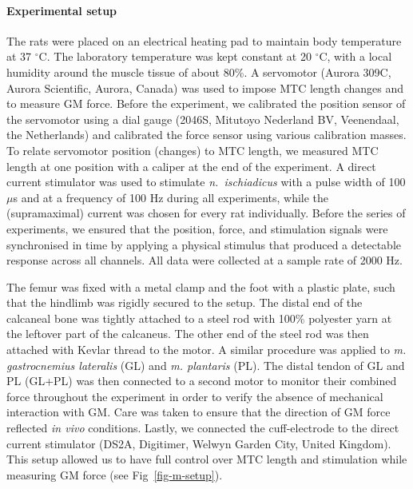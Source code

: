 \documentclass[
  10pt,
  letterpaper,
]{article}
\begin{document}
\paragraph{Experimental setup}\label{experimental-setup}

The rats were placed on an electrical heating pad to maintain body
temperature at 37 \(^{\circ}\)C. The laboratory temperature was kept
constant at 20 \(^{\circ}\)C, with a local humidity around the muscle
tissue of about 80\%. A servomotor (Aurora 309C, Aurora Scientific,
Aurora, Canada) was used to impose MTC length changes and to measure GM
force. Before the experiment, we calibrated the position sensor of the
servomotor using a dial gauge (2046S, Mitutoyo Nederland BV, Veenendaal,
the Netherlands) and calibrated the force sensor using various
calibration masses. To relate servomotor position (changes) to MTC
length, we measured MTC length at one position with a caliper at the end
of the experiment. A direct current stimulator was used to stimulate
\emph{n.~ischiadicus} with a pulse width of 100 \(\mu\)s and at a
frequency of 100 Hz during all experiments, while the (supramaximal)
current was chosen for every rat individually. Before the series of
experiments, we ensured that the position, force, and stimulation
signals were synchronised in time by applying a physical stimulus that
produced a detectable response across all channels. All data were
collected at a sample rate of 2000 Hz.

The femur was fixed with a metal clamp and the foot with a plastic
plate, such that the hindlimb was rigidly secured to the setup. The
distal end of the calcaneal bone was tightly attached to a steel rod
with 100\% polyester yarn at the leftover part of the calcaneus. The
other end of the steel rod was then attached with Kevlar thread to the
motor. A similar procedure was applied to \emph{m. gastrocnemius
lateralis} (GL) and \emph{m. plantaris} (PL). The distal tendon of GL
and PL (GL+PL) was then connected to a second motor to monitor their
combined force throughout the experiment in order to verify the absence
of mechanical interaction with GM. Care was taken to ensure that the
direction of GM force reflected \emph{in vivo} conditions. Lastly, we
connected the cuff-electrode to the direct current stimulator (DS2A,
Digitimer, Welwyn Garden City, United Kingdom). This setup allowed us to
have full control over MTC length and stimulation while measuring GM
force (see Fig~\ref{fig-m-setup}).
\end{document}
